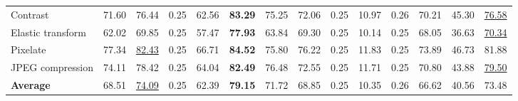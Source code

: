 \begin{table}[t]
{\begin{tabular}{lrrrrrrrrrrrrr}
Contrast & 71.60 & 76.44 & 0.25 & 62.56 & \textbf{83.29} & 75.25 & 72.06 & 0.25 & 10.97 & 0.26 & 70.21 & 45.30 & \underline{76.58} \\
Elastic transform & 62.02 & 69.85 & 0.25 & 57.47 & \textbf{77.93} & 63.84 & 69.30 & 0.25 & 10.14 & 0.25 & 68.05 & 36.63 & \underline{70.34} \\
Pixelate & 77.34 & \underline{82.43} & 0.25 & 66.71 & \textbf{84.52} & 75.80 & 76.22 & 0.25 & 11.83 & 0.25 & 73.89 & 46.73 & 81.88 \\
JPEG compression & 74.11 & 78.42 & 0.25 & 64.04 & \textbf{82.49} & 76.48 & 72.55 & 0.25 & 11.71 & 0.25 & 70.80 & 43.88 & \underline{79.50} \\
\midrule
\textbf{Average} & 68.51 & \underline{74.09} & 0.25 & 62.39 & \textbf{79.15} & 71.72 & 68.85 & 0.25 & 10.35 & 0.26 & 66.62 & 40.56 & 73.48 \\
\bottomrule
\end{tabular}%
}
\end{table}

